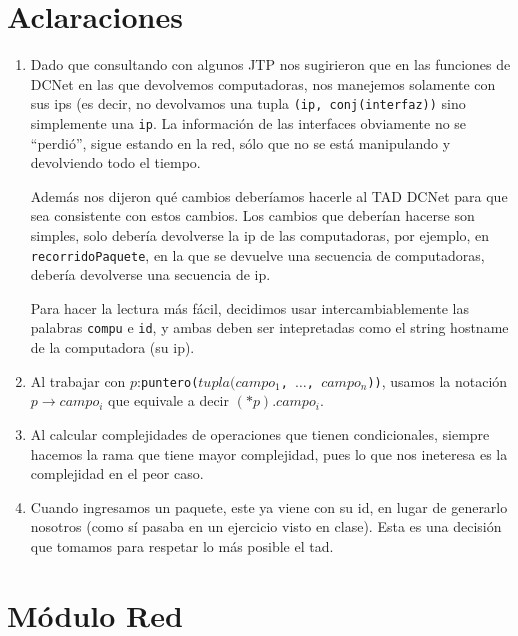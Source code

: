 \documentclass[a4paper,10pt, nofootinbib]{article}
\begin{document}
\maketitle
\thispagestyle{empty}

\section{Aclaraciones}
\begin{enumerate}
  \item Dado que consultando con algunos JTP nos sugirieron que en las funciones de DCNet en las que devolvemos computadoras, nos manejemos solamente con sus ips (es decir, no devolvamos una tupla \texttt{(ip, conj(interfaz))} sino simplemente una \texttt{ip}. La información de las interfaces obviamente no se ``perdió'', sigue estando en la red, sólo que no se está manipulando y devolviendo todo el tiempo.
   
    Además nos dijeron qué cambios deberíamos hacerle al TAD DCNet para que sea consistente con estos cambios. Los cambios que deberían hacerse son simples, solo debería devolverse la ip de las computadoras, por ejemplo, en \texttt{recorridoPaquete}, en la que se devuelve una secuencia de computadoras, debería devolverse una secuencia de ip.
    
    Para hacer la lectura más fácil, decidimos usar intercambiablemente las palabras \texttt{compu} e \texttt{id}, y ambas deben ser intepretadas como el string hostname de la computadora (su ip).
    
    \item Al trabajar con $p$:\texttt{puntero($tupla(campo_1$, $\dots$, $campo_n$))}, usamos la notación $p\to campo_i$ que equivale a decir $(*p).campo_i$. 
    \item Al calcular complejidades de operaciones que tienen condicionales, siempre hacemos la rama que tiene mayor complejidad, pues lo que nos ineteresa es la complejidad en el peor caso. 
	\item Cuando ingresamos un paquete, este ya viene con su id, en lugar de generarlo nosotros (como sí pasaba en un ejercicio visto en clase). Esta es una decisión que tomamos para respetar lo más posible el tad. 

\end{enumerate}

\clearpage


\section{Módulo Red}

\clearpage
\end{document}
